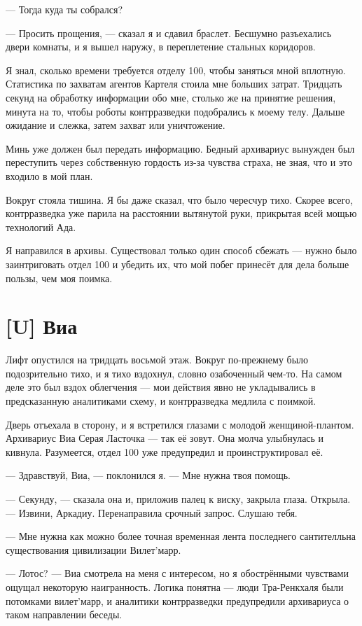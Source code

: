 --- Тогда куда ты собрался?

--- Просить прощения, --- сказал я и сдавил браслет.
Бесшумно разъехались двери комнаты, и я вышел наружу, в переплетение стальных коридоров.

\asterism

Я знал, сколько времени требуется отделу 100, чтобы заняться мной вплотную.
Статистика по захватам агентов Картеля стоила мне больших затрат.
Тридцать секунд на обработку информации обо мне, столько же на принятие решения, минута на то, чтобы роботы контрразведки подобрались к моему телу.
Дальше ожидание и слежка, затем захват или уничтожение.

Минь уже должен был передать информацию.
Бедный архивариус вынужден был переступить через собственную гордость из-за чувства страха, не зная, что и это входило в мой план.

Вокруг стояла тишина.
Я бы даже сказал, что было чересчур тихо.
Скорее всего, контрразведка уже парила на расстоянии вытянутой руки, прикрытая всей мощью технологий Ада.

Я направился в архивы.
Существовал только один способ сбежать --- нужно было заинтриговать отдел 100 и убедить их, что мой побег принесёт для дела больше пользы, чем моя поимка.


\section{[U] Виа}

Лифт опустился на тридцать восьмой этаж.
Вокруг по-прежнему было подозрительно тихо, и я тихо вздохнул, словно озабоченный чем-то.
На самом деле это был вздох облегчения --- мои действия явно не укладывались в предсказанную аналитиками схему, и контрразведка медлила с поимкой.

Дверь отъехала в сторону, и я встретился глазами с молодой женщиной-плантом.
Архивариус Виа Серая Ласточка --- так её зовут.
Она молча улыбнулась и кивнула.
Разумеется, отдел 100 уже предупредил и проинструктировал её.

--- Здравствуй, Виа, --- поклонился я.
--- Мне нужна твоя помощь.

--- Секунду, --- сказала она и, приложив палец к виску, закрыла глаза.
Открыла.
--- Извини, Аркадиу.
Перенаправила срочный запрос.
Слушаю тебя.

--- Мне нужна как можно более точная временная лента последнего сантителльна существования цивилизации Вилет'марр.

--- Лотос? --- Виа смотрела на меня с интересом, но я обострёнными чувствами ощущал некоторую наигранность.
Логика понятна --- люди Тра-Ренкхаля были потомками вилет'марр, и аналитики контрразведки предупредили архивариуса о таком направлении беседы.

